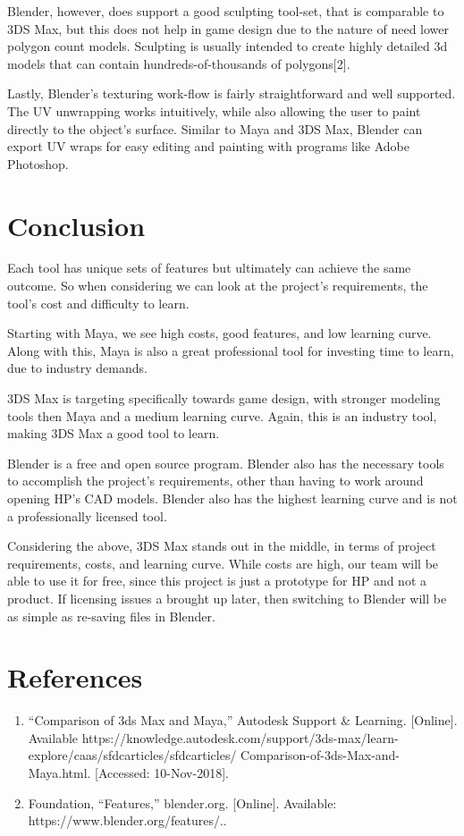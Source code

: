\documentclass[onecolumn, draftclsnofoot,10pt, compsoc]{IEEEtran}
\begin{document}
Blender, however, does support a good sculpting tool-set, that is comparable to 3DS Max, but this does not help in game design due to the nature of need lower polygon count models. Sculpting is usually intended to create highly detailed 3d models that can contain hundreds-of-thousands of polygons[2]. 

Lastly, Blender’s texturing work-flow is fairly straightforward and well supported. The UV unwrapping works intuitively, while also allowing the user to paint directly to the object’s surface. Similar to Maya and 3DS Max, Blender can export UV wraps for easy editing and painting with programs like Adobe Photoshop.

\section{Conclusion}
Each tool has unique sets of features but ultimately can achieve the same outcome. So when considering we can look at the project's requirements, the tool’s cost and difficulty to learn. 

Starting with Maya, we see high costs, good features, and low learning curve. Along with this, Maya is also a great professional tool for investing time to learn, due to industry demands. 

3DS Max is targeting specifically towards game design, with stronger modeling tools then Maya and a medium learning curve. Again, this is an industry tool, making 3DS Max a good tool to learn. 

Blender is a free and open source program. Blender also has the necessary tools to accomplish the project's requirements, other than having to work around opening HP’s CAD models. Blender also has the highest learning curve and is not a professionally licensed tool. 

Considering the above, 3DS Max stands out in the middle, in terms of project requirements, costs, and learning curve. While costs are high, our team will be able to use it for free, since this project is just a prototype for HP and not a product. If licensing issues a brought up later, then switching to Blender will be as simple as re-saving files in Blender.
\newpage

\section{References}
\begin{enumerate}
    \item “Comparison of 3ds Max and Maya,” Autodesk Support \& Learning. [Online]. Available\newline
    https://knowledge.autodesk.com/support/3ds-max/learn-explore/caas/sfdcarticles/sfdcarticles/\newline
    Comparison-of-3ds-Max-and-Maya.html. [Accessed: 10-Nov-2018].
    \item  Foundation, “Features,” blender.org. [Online]. Available: https://www.blender.org/features/..
\end{enumerate}
\end{document}
